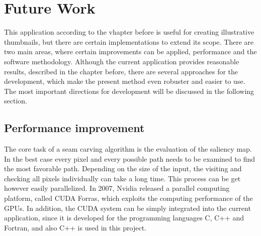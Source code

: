 \documentclass[draft,final]{vutinfth} %
\begin{document}
\chapter{Future Work}
This application according to the vhapter before is useful for creating illustrative thumbnails, but there are certain implementations to extend its scope. 
There are two main areas, where certain improvements can be applied, performance and the software methodology.
Although the current application provides reasonable results, described in the chapter before, there are several approaches for the development, which make the present method even robuster and easier to use.
The most important directions for development will be discussed in the following section.

\section{Performance improvement} 
The core task of a seam carving algorithm is the evaluation of the saliency map.
In the best case every pixel and every possible path needs to be examined to find the most favorable path.
Depending on the size of the input, the visiting and checking all pixels individually can take a long time.
This process can be get however easily parallelized.
In 2007, Nvidia released a parallel computing platform, called CUDA Forras, which exploits the computing performance of the GPUs.
In addition, the CUDA system can be simply integrated into the current application, since it is developed for the programming languages C, C++ and Fortran, and also C++ is used in this project.   
\end{document}

